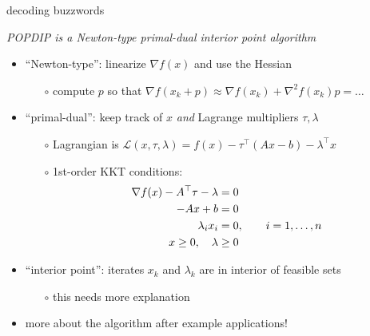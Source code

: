\documentclass[10pt,hyperref]{beamer}
\newcommand{\grad}{\nabla}
\newcommand{\ds}{\displaystyle}
\begin{document}
\begin{frame}{decoding buzzwords}

\begin{center}
\emph{POPDIP is a Newton-type primal-dual interior point algorithm}
\end{center}

\begin{itemize}
\item ``Newton-type'': linearize $\grad f(x)$ and use the Hessian
    \begin{itemize}
    \item[$\circ$] compute $p$ so that $\grad f(x_k + p) \approx \grad f(x_k) + \grad^2 f(x_k) p = \dots$
    \end{itemize}
\item ``primal-dual'': keep track of $x$ \emph{and} Lagrange multipliers $\tau,\lambda$
    \begin{itemize}
    \item[$\circ$] Lagrangian is \qquad $\ds \mathcal{L}(x,\tau,\lambda) = f(x) - \tau^\top (Ax - b) - \lambda^\top x$
    \item[$\circ$] 1st-order KKT conditions:
\begin{align*}
\grad f(x) - A^\top \tau - \lambda &= 0 \\
-A x + b &= 0 \notag \\
\lambda_i x_i &=0, \qquad i=1,\dots,n \notag \\
x \ge 0, \quad \lambda &\ge 0 \notag
\end{align*}
    \end{itemize}
\item ``interior point'': iterates $x_k$ and $\lambda_k$ are in interior of feasible sets
    \begin{itemize}
    \item[$\circ$] this needs more explanation
    \end{itemize}

\medskip
\item more about the algorithm after example applications!
\end{itemize}
\end{frame}
\end{document}
